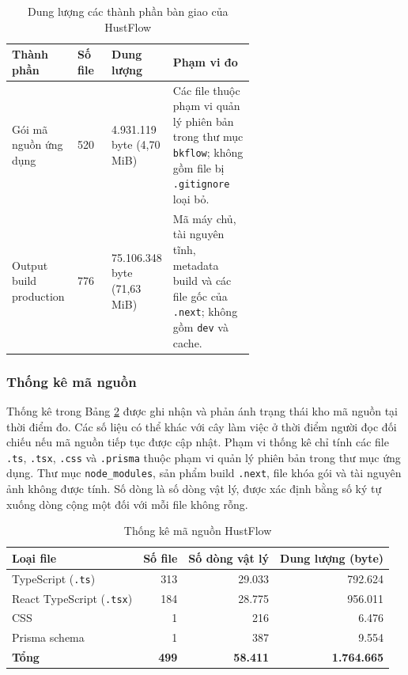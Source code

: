 \documentclass[../DoAn.tex]{subfiles}
\begin{document}
\begin{table}[H]
    \centering
    \caption{Dung lượng các thành phần bàn giao của HustFlow}
    \label{table:chapter4_artifacts}
    \begin{tabularx}{\linewidth}{|p{0.27\linewidth}|p{0.14\linewidth}|p{0.20\linewidth}|X|}
        \hline
        \textbf{Thành phần} & \textbf{Số file} & \textbf{Dung lượng} & \textbf{Phạm vi đo} \\ \hline
        Gói mã nguồn ứng dụng & 520 & 4.931.119 byte (4,70 MiB) & Các file thuộc phạm vi quản lý phiên bản trong thư mục \texttt{bkflow}; không gồm file bị \texttt{.gitignore} loại bỏ. \\ \hline
        Output build production & 776 & 75.106.348 byte (71,63 MiB) & Mã máy chủ, tài nguyên tĩnh, metadata build và các file gốc của \texttt{.next}; không gồm \texttt{dev} và cache. \\ \hline
    \end{tabularx}
\end{table}

\subsubsection{Thống kê mã nguồn}

Thống kê trong Bảng \ref{table:chapter4_source_stats} được ghi nhận và phản ánh trạng thái kho mã nguồn tại thời điểm đo. Các số liệu có thể khác với cây làm việc ở thời điểm người đọc đối chiếu nếu mã nguồn tiếp tục được cập nhật. Phạm vi thống kê chỉ tính các file \texttt{.ts}, \texttt{.tsx}, \texttt{.css} và \texttt{.prisma} thuộc phạm vi quản lý phiên bản trong thư mục ứng dụng. Thư mục \texttt{node\_modules}, sản phẩm build \texttt{.next}, file khóa gói và tài nguyên ảnh không được tính. Số dòng là số dòng vật lý, được xác định bằng số ký tự xuống dòng cộng một đối với mỗi file không rỗng.

\begin{table}[H]
    \centering
    \caption{Thống kê mã nguồn HustFlow}
    \label{table:chapter4_source_stats}
    \begin{tabular}{|l|r|r|r|}
        \hline
        \textbf{Loại file} & \textbf{Số file} & \textbf{Số dòng vật lý} & \textbf{Dung lượng (byte)} \\ \hline
        TypeScript (\texttt{.ts}) & 313 & 29.033 & 792.624 \\ \hline
        React TypeScript (\texttt{.tsx}) & 184 & 28.775 & 956.011 \\ \hline
        CSS & 1 & 216 & 6.476 \\ \hline
        Prisma schema & 1 & 387 & 9.554 \\ \hline
        \textbf{Tổng} & \textbf{499} & \textbf{58.411} & \textbf{1.764.665} \\ \hline
    \end{tabular}
\end{table}
\end{document}

